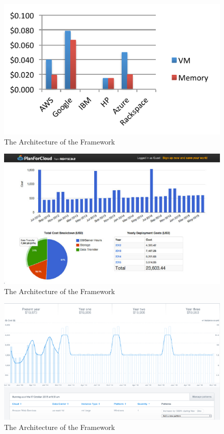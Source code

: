 \documentclass{sig-alternate}
\begin{document}
\begin{figure}[htb] 
  \centering 
    \includegraphics[width=1.0\columnwidth]{images/fig6.pdf} 
  \caption{The Architecture of the Framework}\label{F:fig6} 
\end{figure} 

\begin{figure}[htb] 
  \centering 
    \includegraphics[width=1.0\columnwidth]{images/fig3b.pdf} 
  \caption{The Architecture of the Framework}\label{F:fig7} 
\end{figure} 

\begin{figure}[htb] 
  \centering 
    \includegraphics[width=1.0\columnwidth]{images/fig4b.pdf} 
  \caption{The Architecture of the Framework}\label{F:fig8} 
\end{figure} 
\end{document}
